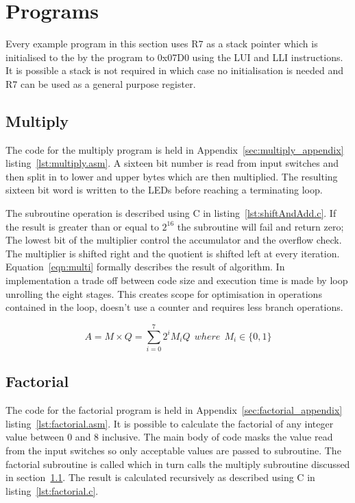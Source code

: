

\section{Programs}
Every example program in this section uses R7 as a stack pointer which is initialised to the by the program to 0x07D0 using the LUI and LLI instructions.
It is possible a stack is not required in which case no initialisation is needed and R7 can be used as a general purpose register. 





\subsection{Multiply}
\label{sec:multiply}
The code for the multiply program is held in Appendix~\ref{sec:multiply_appendix} listing~\ref{lst:multiply.asm}.
A sixteen bit number is read from input switches and then split in to lower and upper bytes which are then multiplied.
The resulting sixteen bit word is written to the LEDs before reaching a terminating loop.

The subroutine operation is described using C in listing~\ref{lst:shiftAndAdd.c}. 
If the result is greater than or equal to $2^{16}$ the subroutine will fail and return zero;
The lowest bit of the multiplier control the accumulator and the overflow check.
The multiplier is shifted right and the quotient is shifted left at every iteration.
Equation~\eqref{eqn:multi} formally describes the result of algorithm.
In implementation a trade off between code size and execution time is made by loop unrolling the eight stages.
This creates scope for optimisation in operations contained in the loop, doesn't use a counter and requires less branch operations.



\begin{equation}
   A = M \times Q = \sum_{i=0}^{7} 2^i M_i Q\:\:where\:\:M_i \in \{0,1\}
   \label{eqn:multi}
\end{equation}





\subsection{Factorial}
\label{sec:factorial}
The code for the factorial program is held in Appendix~\ref{sec:factorial_appendix} listing~\ref{lst:factorial.asm}.
It is possible to calculate the factorial of any integer value between $0$ and $8$ inclusive.
The main body of code masks the value read from the input switches so only acceptable values are passed to subroutine.
The factorial subroutine is called which in turn calls the multiply subroutine discussed in section~\ref{sec:multiply}. 
The result is calculated recursively as described using C in listing~\ref{lst:factorial.c}. 


